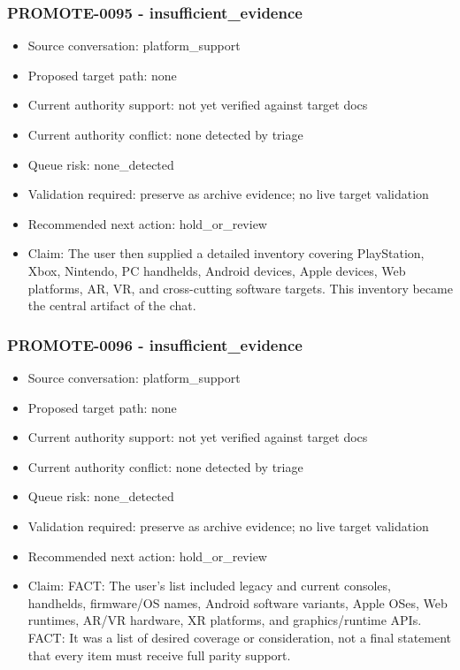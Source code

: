 \documentclass[11pt,a4paper]{report}
\begin{document}
\subsubsection{PROMOTE-0095 - insufficient\_evidence}

\begin{itemize}
\item Source conversation: platform\_support
\item Proposed target path: none
\item Current authority support: not yet verified against target docs
\item Current authority conflict: none detected by triage
\item Queue risk: none\_detected
\item Validation required: preserve as archive evidence; no live target validation
\item Recommended next action: hold\_or\_review
\item Claim: The user then supplied a detailed inventory covering PlayStation, Xbox, Nintendo, PC handhelds, Android devices, Apple devices, Web platforms, AR, VR, and cross-cutting software targets. This inventory became the central artifact of the chat.
\end{itemize}

\subsubsection{PROMOTE-0096 - insufficient\_evidence}

\begin{itemize}
\item Source conversation: platform\_support
\item Proposed target path: none
\item Current authority support: not yet verified against target docs
\item Current authority conflict: none detected by triage
\item Queue risk: none\_detected
\item Validation required: preserve as archive evidence; no live target validation
\item Recommended next action: hold\_or\_review
\item Claim: FACT: The user's list included legacy and current consoles, handhelds, firmware/OS names, Android software variants, Apple OSes, Web runtimes, AR/VR hardware, XR platforms, and graphics/runtime APIs. FACT: It was a list of desired coverage or consideration, not a final statement that every item must receive full parity support.
\end{itemize}
\end{document}
